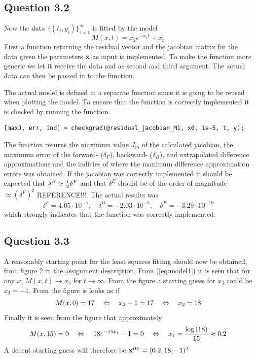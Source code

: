 \subsection*{Question 3.2}
Now the data $\{(t_i, y_i)\}_{i=1}^m$ is fitted by the model
\begin{equation}\label{eq:model1}
    M(x, t) = x_2 e^{-x_1t} + x_3
\end{equation}
First a function returning the residual vector and the jacobian matrix for the data given the parameters $\mathbf{x}$ as input is implemented. To make the function more generic we let it receive the data  and  as second and third argument. The actual data can then be passed in to the  function.


The actual model is defined in a separate function  since it is going to be reused when plotting the model. To ensure that the function is correctly implemented it is checked by running the  function.
\begin{lstlisting}
[maxJ, err, ind] = checkgrad(@residual_jacobian_M1, x0, 1e-5, t, y);
\end{lstlisting}
The function returns the maximum value $J_m$ of the calculated jacobian, the maximum error of the forward- ($\delta_F$), backward- ($\delta_B$), and extrapolated difference approximations and the indicies of where the maximum difference approximation errors was obtained. If the jacobian was correctly implemented it should be expected that $\delta^B\simeq\frac{1}{2}\delta^F$ and that $\delta^E$ should be of the order of magnitude $\simeq(\delta^F)^2$ REFERENCE!!!. The actual results was
\begin{equation*}
    \delta^F = 4.05\cdot10^{-5},\quad \delta^B = -2.03\cdot10^{-5},\quad \delta^E = -3.29\cdot10^{-10}
\end{equation*}
which strongly indicates that the  function was correctly implemented.

\subsection*{Question 3.3}
A reasonably starting point for the least squares fitting should now be obtained, from figure 2 in the assignment description. From (\ref{eq:model1}) it is seen that for any $x$, $M(x, t) \to x_3$ for $t\to\infty$. From the figure a starting guess for $x_3$ could be $x_3=-1$. From the figure is looks as if
\begin{equation*}
    M(x, 0) = 17 \quad\Leftrightarrow\quad x_2 - 1 = 17 \quad\Leftrightarrow\quad x_2 = 18
\end{equation*}
Finally it is seen from the figure that approximately
\begin{equation*}
    M(x, 15) = 0 \quad\Leftrightarrow\quad 18e^{-15x_1} - 1 = 0 \quad\Leftrightarrow\quad x_1 = \frac{\log{(18)}}{15} \approx 0.2
\end{equation*}
A decent starting guess will therefore be $\mathbf{x}^{(0)}=(0.2, 18, -1)^T$

